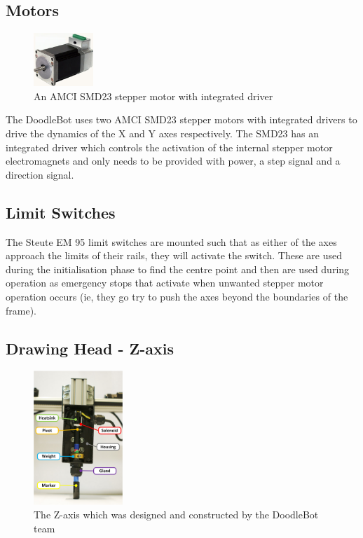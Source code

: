 \subsection{Motors}
	\begin{figure}[h]
		\centering
		\includegraphics[width=0.2\textwidth]{figures/cncMachine/amci-smd23.jpg}
		\caption{An AMCI SMD23 stepper motor with integrated driver}
	\end{figure}
	
	The DoodleBot uses two AMCI SMD23 stepper motors with integrated drivers to drive the dynamics of the X and Y axes respectively. The SMD23 has an integrated driver which controls the activation of the internal stepper motor electromagnets and only needs to be provided with power, a step signal and a direction signal.
\subsection{Limit Switches}
	The Steute EM 95 limit switches are mounted such that as either of the axes approach the limits of their rails, they will activate the switch. These are used during the initialisation phase to find the centre point and then are used during operation as emergency stops that activate when unwanted stepper motor operation occurs (ie, they go try to push the axes beyond the boundaries of the frame).
\subsection{Drawing Head - Z-axis}
	\begin{figure}[h]
		\centering
		\includegraphics[width=0.3\textwidth]{figures/cncMachine/Z_axis.jpg}
		\caption{The Z-axis which was designed and constructed by the DoodleBot team}
	\end{figure}

